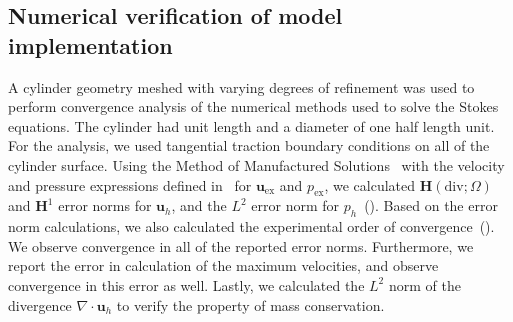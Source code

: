 \documentclass[fleqn]{wlscirep}
\newcommand{\uu}{\mathbf{u}}
\begin{document}
\subsection{Numerical verification of model implementation}\label{subsec:numerical_verification}
A cylinder geometry meshed with varying degrees of refinement was used to
perform convergence analysis of the numerical methods used to solve the Stokes equations.
The cylinder had unit length and a diameter of one half length unit.
For the analysis, we used tangential traction boundary conditions on all
of the cylinder surface. Using the Method of Manufactured Solutions~\cite{Roache2001CodeSolutions}
with the velocity and pressure expressions defined in~
for $\uu_{\mathrm{ex}}$ and $p_{\mathrm{ex}}$, we calculated $\mathbf{H}(\mathrm{div};\Omega)$
and $\mathbf{H}^1$ error norms for $\uu_h$, and the $L^2$ error norm for
$p_h$~(). Based on the error norm calculations,
we also calculated the experimental order of convergence~().
We observe convergence in all of the reported error norms. Furthermore,
we report the error in calculation of the maximum velocities, and observe
convergence in this error as well. Lastly, we calculated the $L^2$ norm of
the divergence $\nabla\cdot\uu_h$ to verify the property of mass conservation.
\end{document}
